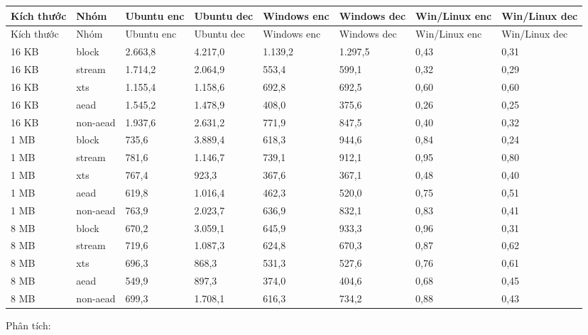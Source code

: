 \documentclass[12pt,a4paper,oneside]{report}
\begin{document}
\begin{longtable}{p{}p{}p{}p{}p{}p{}p{}p{}}
\toprule
Kích thước & Nhóm & Ubuntu enc & Ubuntu dec & Windows enc & Windows dec & Win/Linux enc & Win/Linux dec \\
\midrule
\endfirsthead
\toprule
Kích thước & Nhóm & Ubuntu enc & Ubuntu dec & Windows enc & Windows dec & Win/Linux enc & Win/Linux dec \\
\midrule
\endhead
16 KB & block & 2.663,8 & 4.217,0 & 1.139,2 & 1.297,5 & 0,43 & 0,31 \\
16 KB & stream & 1.714,2 & 2.064,9 & 553,4 & 599,1 & 0,32 & 0,29 \\
16 KB & xts & 1.155,4 & 1.158,6 & 692,8 & 692,5 & 0,60 & 0,60 \\
16 KB & aead & 1.545,2 & 1.478,9 & 408,0 & 375,6 & 0,26 & 0,25 \\
16 KB & non-aead & 1.937,6 & 2.631,2 & 771,9 & 847,5 & 0,40 & 0,32 \\
1 MB & block & 735,6 & 3.889,4 & 618,3 & 944,6 & 0,84 & 0,24 \\
1 MB & stream & 781,6 & 1.146,7 & 739,1 & 912,1 & 0,95 & 0,80 \\
1 MB & xts & 767,4 & 923,3 & 367,6 & 367,1 & 0,48 & 0,40 \\
1 MB & aead & 619,8 & 1.016,4 & 462,3 & 520,0 & 0,75 & 0,51 \\
1 MB & non-aead & 763,9 & 2.023,7 & 636,9 & 832,1 & 0,83 & 0,41 \\
8 MB & block & 670,2 & 3.059,1 & 645,9 & 933,3 & 0,96 & 0,31 \\
8 MB & stream & 719,6 & 1.087,3 & 624,8 & 670,3 & 0,87 & 0,62 \\
8 MB & xts & 696,3 & 868,3 & 531,3 & 527,6 & 0,76 & 0,61 \\
8 MB & aead & 549,9 & 897,3 & 374,0 & 404,6 & 0,68 & 0,45 \\
8 MB & non-aead & 699,3 & 1.708,1 & 616,3 & 734,2 & 0,88 & 0,43 \\
\bottomrule
\end{longtable}


Phân tích:
\end{document}
